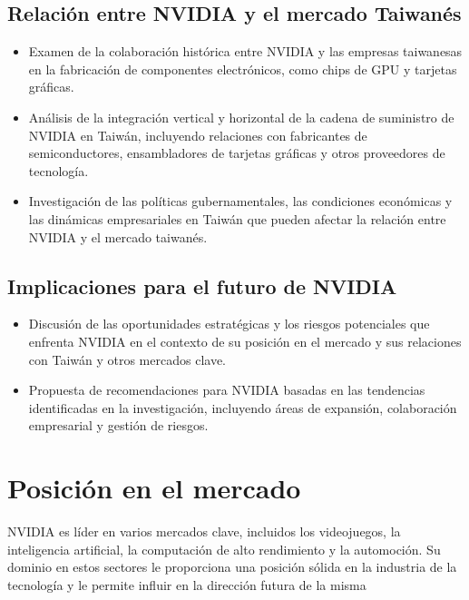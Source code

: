 \documentclass[letterpaper, 12pt]{article}
\begin{document}
\subsection*{Relación entre NVIDIA y el mercado Taiwanés}

\begin{itemize}
      \item Examen de la colaboración histórica entre NVIDIA y las
            empresas taiwanesas en la fabricación de componentes
            electrónicos, como chips de GPU y tarjetas gráficas.

      \item Análisis de la integración vertical y horizontal de la
            cadena de suministro de NVIDIA en Taiwán, incluyendo
            relaciones con fabricantes de semiconductores,
            ensambladores de tarjetas gráficas y otros proveedores de
            tecnología.

      \item Investigación de las políticas gubernamentales,
            las condiciones económicas y las dinámicas empresariales en
            Taiwán que pueden afectar la relación entre NVIDIA y el mercado
            taiwanés.
\end{itemize}

\subsection*{Implicaciones para el futuro de NVIDIA}

\begin{itemize}
      \item Discusión de las oportunidades estratégicas y los riesgos
            potenciales que enfrenta NVIDIA en el contexto de su posición
            en el mercado y sus relaciones con Taiwán y otros mercados clave.

      \item Propuesta de recomendaciones para NVIDIA basadas en
            las tendencias identificadas en la investigación, incluyendo
            áreas de expansión, colaboración empresarial y gestión de riesgos.
\end{itemize}

\section{Posición en el mercado}

NVIDIA es líder en varios mercados clave, incluidos los videojuegos,
la inteligencia artificial, la computación de alto rendimiento y
la automoción. Su dominio en estos sectores le proporciona una
posición sólida en la industria de la tecnología y le permite
influir en la dirección futura de la misma
\end{document}
